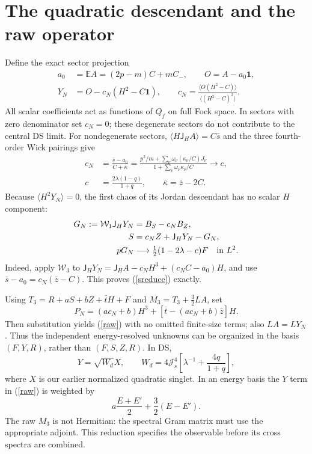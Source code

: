\documentclass[11pt,a4paper]{article}
\newcommand{\Js}{\mathcal J_s}
\newcommand{\E}{\mathbb E}
\newcommand{\av}[1]{\langle #1\rangle}
\newcommand{\W}{\mathcal W}
\newcommand{\JH}{\mathsf J_H}
\begin{document}
\newpage
\section{The quadratic descendant and the raw operator}
Define the exact sector projection
\begin{align}
 a_0&=\E A=(2p-m)C+mC_-,\qquad O=A-a_0\mathbf1,\\
 Y_N&=O-c_N(H^2-C\mathbf1),\qquad
 c_N=\frac{\av{O(H^2-C)}}{\av{(H^2-C)^2}}.
\end{align}
All scalar coefficients act as functions of $Q_f$ on full Fock
space. In sectors with zero denominator set $c_N=0$; these
degenerate sectors do not contribute to the central DS limit.
For nondegenerate sectors, $\av{H\JH A}=C\bar s$ and the three
fourth-order Wick pairings give
\begin{align}
 c_N&=\frac{\bar s-a_0}{C+\bar\kappa}
 =\frac{p^2/m+\sum_\nu\omega_\nu(\kappa_\nu/C)J_\nu}
 {1+\sum_\nu\omega_\nu\kappa_\nu/C}\longrightarrow c,\\
 c&=\frac{2\lambda(1-q)}{1+q},\qquad
 \bar\kappa=\bar z-2C.\label{c}
\end{align}
Because $\av{H^2Y_N}=0$, the first chaos of its Jordan descendant
has no scalar $H$ component:
\begin{align}
 G_N:=\W_1\JH Y_N&=B_S-c_NB_Z,\\
 S&=c_N Z+\JH Y_N-G_N,\label{sreduce}\\
 pG_N&\longrightarrow\tfrac12(1-2\lambda-c)F
 \quad\hbox{in }L^2.
\end{align}
Indeed, apply $\W_3$ to
$\JH Y_N=\JH A-c_NH^3+(c_NC-a_0)H$, and use
$\bar s-a_0=c_N(\bar z-C)$. This proves (\ref{sreduce}) exactly.

Using $T_3=R+aS+bZ+\bar tH+F$ and
$M_3=T_3+\tfrac32 LA$, set
\begin{equation}
 P_N=(ac_N+b)H^3+[\bar t-(ac_N+b)\bar z]H.\label{poly}
\end{equation}
Then substitution yields (\ref{raw}) with no omitted finite-size
terms; also $LA=LY_N$. Thus the independent energy-resolved
unknowns can be organized in the basis $(F,Y,R)$, rather than
$(F,S,Z,R)$. In DS,
\[
 Y=\sqrt{W_d}X,\qquad
 W_d=4\Js^4\left[\lambda^{-1}+\frac{4q}{1+q}\right],
\]
where $X$ is our earlier normalized quadratic singlet. In an
energy basis the $Y$ term in (\ref{raw}) is weighted by
\[
 a\frac{E+E'}2+\frac32(E-E').
\]
The raw $M_3$ is not Hermitian: the spectral Gram matrix must use
the appropriate adjoint. This reduction specifies the observable
before its cross spectra are combined.
\end{document}
